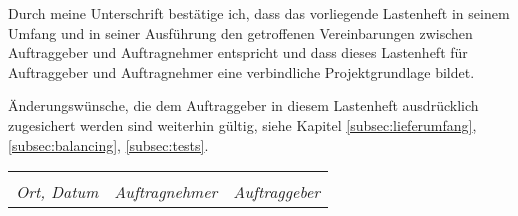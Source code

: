 Durch meine Unterschrift bestätige ich, dass das vorliegende Lastenheft in seinem Umfang
und in seiner Ausführung den getroffenen Vereinbarungen zwischen Auftraggeber und
Auftragnehmer entspricht und dass dieses Lastenheft für Auftraggeber und Auftragnehmer
eine verbindliche Projektgrundlage bildet.

\vspace{1em}

Änderungswünsche, die dem Auftraggeber in diesem Lastenheft ausdrücklich zugesichert werden
sind weiterhin gültig, siehe Kapitel \ref{subsec:lieferumfang}, \ref{subsec:balancing}, \ref{subsec:tests}.

\vspace{2cm}

\begin{xltabular}{\textwidth}{XXX}
    \dotfill            & \dotfill                  & \dotfill              \\
    \textit{Ort, Datum} & \textit{Auftragnehmer}    & \textit{Auftraggeber} \\
\end{xltabular}
